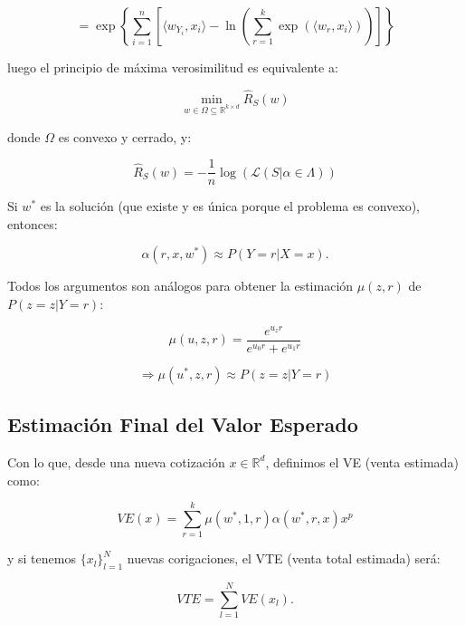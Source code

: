 \[ = \exp \left\{ \sum_{i=1}^{n} \left[ \langle w_{Y_i}, x_i \rangle - \ln \left( \sum_{r=1}^{k} \exp(\langle w_r, x_i \rangle) \right) \right] \right\} \]

luego el principio de máxima verosimilitud es equivalente a:

\[ \min_{w \in \Omega \subseteq \mathbb{R}^{k \times d}} \hat{R}_S(w) \]

donde \( \Omega \) es convexo y cerrado, y:

\[ \hat{R}_S(w) = -\frac{1}{n} \log (\mathcal{L}(S|\alpha \in \Lambda)) \]

Si \( w^* \) es la solución (que existe y es única porque el problema es convexo), entonces:

\[ \alpha(r, x, w^*) \approx P(Y = r | X = x). \]

Todos los argumentos son análogos para obtener la estimación \( \mu(z, r) \) de \( P(z = z | Y = r) \):

\[ \mu(u, z, r) = \frac{e^{u_z r}}{e^{u_0 r} + e^{u_1 r}} \]

\[ \Rightarrow \mu(u^*, z, r) \approx P(z = z | Y = r) \]

\subsection{Estimación Final del Valor Esperado}

Con lo que, desde una nueva cotización \( x \in \mathbb{R}^d \), definimos el VE (venta estimada) como:

\[ VE(x) = \sum_{r=1}^{k} \mu(w^*, 1, r) \alpha(w^*, r, x) x^p \]

y si tenemos \( \{x_l\}_{l=1}^{N} \) nuevas corigaciones, el VTE (venta total estimada) será:

\[ VTE = \sum_{l=1}^{N} VE(x_l). \]

